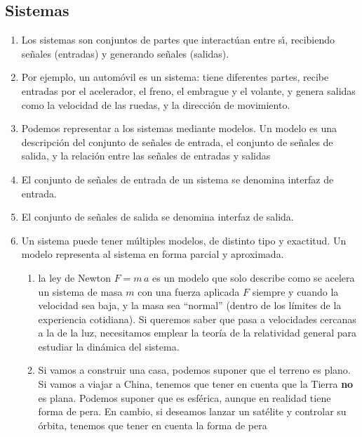 \subsection{Sistemas}

\begin{enumerate}
    
\item Los sistemas son conjuntos de partes que interact\'{u}an entre
  s\'{\i}, recibiendo se\~{n}ales (entradas) y generando se\~{n}ales
  (salidas).

\item Por ejemplo, un autom\'{o}vil es un sistema: tiene diferentes partes,
recibe entradas por el acelerador, el freno, el embrague y el volante, y 
genera salidas como la velocidad de las ruedas, y la direcci\'{o}n de movimiento.

\item Podemos representar a los sistemas mediante modelos.
  Un modelo es una descripci\'{o}n del conjunto de
  se\~{n}ales de entrada, el conjunto de se\~{n}ales de salida, y la
  relaci\'{o}n entre las se\~{n}ales de entradas y salidas
        
\item El conjunto de se\~{n}ales de entrada de un sistema se denomina
  interfaz de entrada.

\item El conjunto de se\~{n}ales de salida se denomina interfaz de
  salida.

\item Un sistema puede tener m\'{u}ltiples modelos, de distinto tipo y
  exactitud. Un modelo representa al sistema en forma parcial y aproximada.
  \begin{enumerate}
  \item la ley de Newton $F = m \, a$ es un modelo que solo describe 
  como se acelera un sistema de masa $m$ con una fuerza aplicada $F$ siempre y cuando
  la velocidad sea baja, y la masa sea ``normal'' 
  (dentro de los límites de la experiencia cotidiana). 
  Si queremos saber que pasa a velocidades cercanas a la de la luz,
  necesitamos emplear la teoría de la relatividad general para estudiar la dinámica del sistema.
  \item Si vamos a construir una
  casa, podemos suponer que el terreno es plano. Si vamos a viajar a China, tenemos que tener
  en cuenta que la Tierra \textbf{no} es plana. Podemos suponer que es esférica, aunque en realidad tiene forma de pera. En cambio, si deseamos lanzar un satélite y controlar su órbita, tenemos que tener en cuenta la forma de pera
  \end{enumerate}


\end{enumerate}
